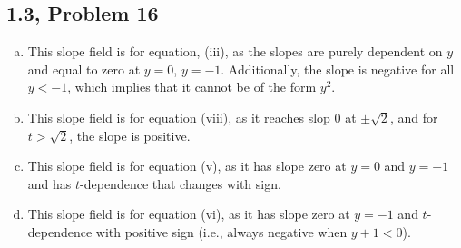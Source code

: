\documentclass[12pt]{mypackage}
\begin{document}
\subsection{1.3, Problem 16}%
\begin{enumerate}[(a)]
  \item This slope field is for equation, (iii), as the slopes are purely dependent on $y$ and equal to zero at $y=0$, $y=-1$. Additionally, the slope is negative for all $y < -1$, which implies that it cannot be of the form $y^2$.
  \item This slope field is for equation (viii), as it reaches slop $0$ at $\pm \sqrt{2}$, and for $t > \sqrt{2}$, the slope is positive.
  \item This slope field is for equation (v), as it has slope zero at $y=0$ and $y=-1$ and has $t$-dependence that changes with sign.
  \item This slope field is for equation (vi), as it has slope zero at $y=-1$ and $t$-dependence with positive sign (i.e., always negative when $y + 1 < 0$).
\end{enumerate}
\end{document}
